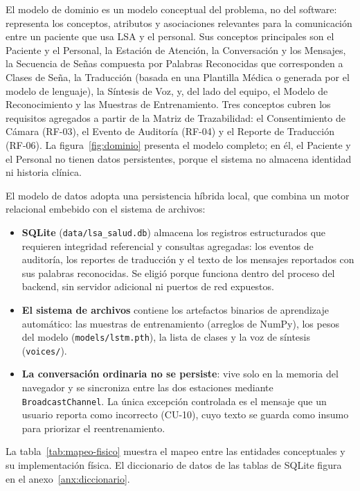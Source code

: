 El modelo de dominio es un modelo conceptual del problema, no del software: representa los conceptos, atributos y asociaciones relevantes para la comunicación entre un paciente que usa LSA y el personal. Sus conceptos principales son el Paciente y el Personal, la Estación de Atención, la Conversación y los Mensajes, la Secuencia de Señas compuesta por Palabras Reconocidas que corresponden a Clases de Seña, la Traducción (basada en una Plantilla Médica o generada por el modelo de lenguaje), la Síntesis de Voz, y, del lado del equipo, el Modelo de Reconocimiento y las Muestras de Entrenamiento. Tres conceptos cubren los requisitos agregados a partir de la Matriz de Trazabilidad: el Consentimiento de Cámara (RF-03), el Evento de Auditoría (RF-04) y el Reporte de Traducción (RF-06). La figura~\ref{fig:dominio} presenta el modelo completo; en él, el Paciente y el Personal no tienen datos persistentes, porque el sistema no almacena identidad ni historia clínica.


El modelo de datos adopta una persistencia híbrida local, que combina un motor relacional embebido con el sistema de archivos:
\begin{itemize}
  \item \textbf{SQLite} (\texttt{data/lsa\_salud.db}) almacena los registros estructurados que requieren integridad referencial y consultas agregadas: los eventos de auditoría, los reportes de traducción y el texto de los mensajes reportados con sus palabras reconocidas. Se eligió porque funciona dentro del proceso del backend, sin servidor adicional ni puertos de red expuestos.
  \item \textbf{El sistema de archivos} contiene los artefactos binarios de aprendizaje automático: las muestras de entrenamiento (arreglos de NumPy), los pesos del modelo (\texttt{models/lstm.pth}), la lista de clases y la voz de síntesis (\texttt{voices/}).
  \item \textbf{La conversación ordinaria no se persiste}: vive solo en la memoria del navegador y se sincroniza entre las dos estaciones mediante \texttt{BroadcastChannel}. La única excepción controlada es el mensaje que un usuario reporta como incorrecto (CU-10), cuyo texto se guarda como insumo para priorizar el reentrenamiento.
\end{itemize}

La tabla~\ref{tab:mapeo-fisico} muestra el mapeo entre las entidades conceptuales y su implementación física. El diccionario de datos de las tablas de SQLite figura en el anexo~\ref{anx:diccionario}.

